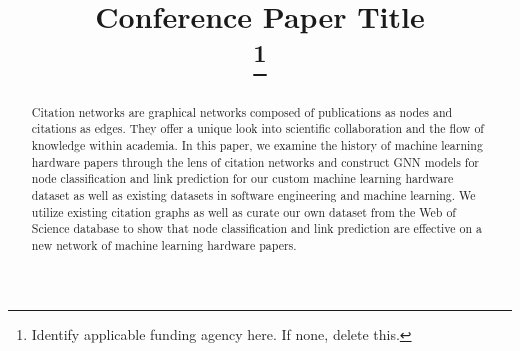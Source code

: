 \documentclass[conference]{IEEEtran}
\begin{document}
\title{Conference Paper Title\\
\thanks{Identify applicable funding agency here. If none, delete this.}
}

\author{
\and
{}
\and
{}
\and
{}
\and
{}
\and
{}
}

\maketitle

\begin{abstract}
Citation networks are graphical networks composed of publications as nodes and citations as edges. 
They offer a unique look into scientific collaboration and the flow of knowledge within academia. 
In this paper, we examine the history of machine learning hardware papers through the lens of citation 
networks and construct GNN models for node classification and link prediction for our custom machine 
learning hardware dataset as well as existing datasets in software engineering and machine learning. 
We utilize existing citation graphs as well as curate our own dataset from the Web of Science database 
to show that node classification and link prediction are effective on a new network of machine learning 
hardware papers.
\end{abstract}
\end{document}
